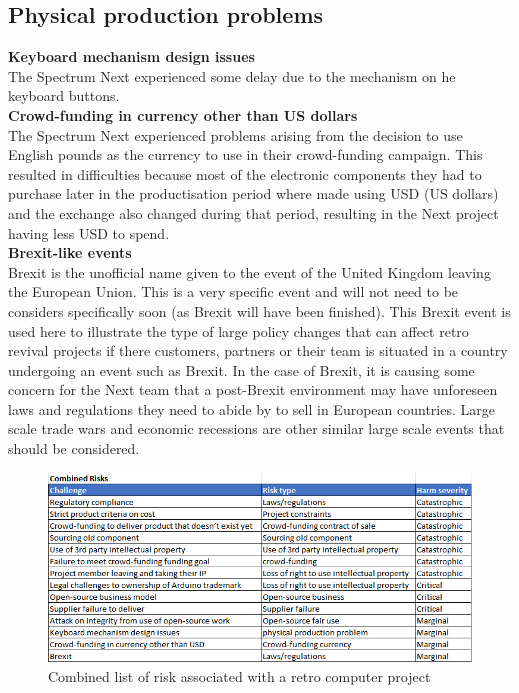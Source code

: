 \subsection{Physical production problems}

\textbf{Keyboard mechanism design issues}\\
The Spectrum Next experienced some delay due to the mechanism on he keyboard buttons.\\ 

\textbf{Crowd-funding in currency other than US dollars}\\
The Spectrum Next experienced problems arising from the decision to use English pounds as the currency to use in their crowd-funding campaign. This resulted in difficulties because most of the electronic components they had to purchase later in the productisation period where made using USD (US dollars) and the exchange also changed during that period, resulting in the Next project having less USD to spend.\\ 

\textbf{Brexit-like events}\\
Brexit is the unofficial name given to the event of the United Kingdom leaving the European Union. This is a very specific event and will not need to be considers specifically soon (as Brexit will have been finished). This Brexit event is used here to illustrate the type of large policy changes that can affect retro revival projects if there customers, partners or their team is situated in a country undergoing an event such as Brexit. In the case of Brexit, it is causing some concern for the Next team that a post-Brexit environment may have unforeseen laws and regulations they need to abide by to sell in European countries. Large scale trade wars and economic recessions are other similar large scale events that should be considered.\\

\begin{figure} \begin{center}
\includegraphics[width= 1\linewidth]{pics/risk_list} 
\end{center} 
\caption{Combined list of risk associated with a retro computer project}
\label{case_study_process}
\end{figure} 